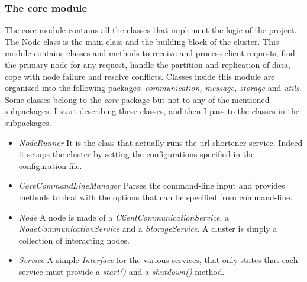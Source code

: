 \documentclass{article}
\begin{document}
\subsubsection{The core module} 
The core module contains all the classes that implement the logic of the project. The Node class is the main class and the building block of the cluster. This module contains classes and methods to receive and process client requests, find the primary node for any request, handle the partition and replication of data, cope with node failure and resolve conflicts. Classes inside this module are organized into the following packages: \textit{communication, message, storage} and \textit{utils}. Some classes belong to the \textit{core} package but not to any of the mentioned subpackages. I start describing these classes, and then I pass to the classes in the subpackages. \\
\begin{itemize}
\item \textit{NodeRunner} It is the class that actually runs the url-shortener service. Indeed it setups the cluster by setting the configurations specified in the configuration file.
\item \textit{CoreCommandLineManager} Parses the command-line input and provides methods to deal with the options that can be specified from command-line.
\item \textit{Node} A node is made of a \textit{ClientCommunicationService}, a \textit{NodeCommunicationService} and a \textit{StorageService}. A cluster is simply a collection of interacting nodes. 
\item \textit{Service} A simple \textit{Interface} for the various services, that only states that each service must provide a \textit{start()} and a \textit{shutdown()} method.
\end{itemize}
\end{document}
